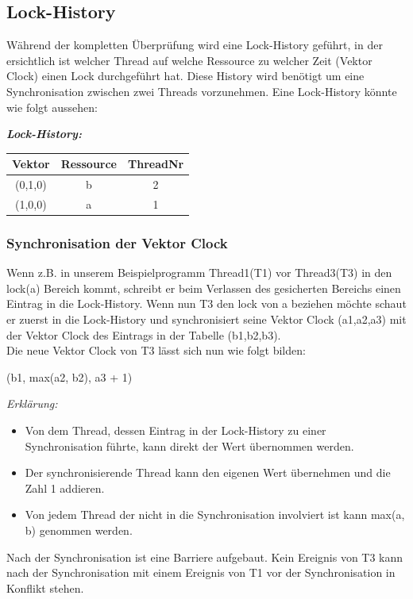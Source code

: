 \documentclass[10pt,a4paper]{article}
\begin{document}
\subsection{Lock-History}
\begin{flushleft}
Während der kompletten Überprüfung wird eine Lock-History geführt, in der ersichtlich ist welcher Thread auf welche Ressource zu welcher Zeit (Vektor Clock) einen Lock durchgeführt hat. Diese History wird benötigt um eine Synchronisation zwischen zwei Threads vorzunehmen. Eine Lock-History könnte wie folgt aussehen:
\end{flushleft}
\begin{center}
\textbf{\textit{Lock-History:}}\\[0.5cm]
\begin{tabular}{ c c c }
  Vektor & Ressource & ThreadNr \\\hline
  (0,1,0) & b & 2 \\
  (1,0,0) & a & 1 \\\hline
\end{tabular}
\end{center}
\subsubsection{Synchronisation der Vektor Clock}
\begin{flushleft}
Wenn z.B. in unserem Beispielprogramm Thread1(T1) vor Thread3(T3) in den lock(a) Bereich kommt, schreibt er beim Verlassen des gesicherten Bereichs einen Eintrag in die Lock-History. Wenn nun T3 den lock von a beziehen möchte schaut er zuerst in die Lock-History und synchronisiert seine Vektor Clock (a1,a2,a3) mit der Vektor Clock des Eintrags in der Tabelle (b1,b2,b3).\\
Die neue Vektor Clock von T3 lässt sich nun wie folgt bilden: 
\begin{center}(b1, max(a2, b2), a3 + 1)\end{center}
\textit{Erklärung:}
\begin{itemize}
\item Von dem Thread, dessen Eintrag in der Lock-History zu einer Synchronisation führte, kann direkt der Wert übernommen werden.
\item Der synchronisierende Thread kann den eigenen Wert übernehmen und die Zahl 1 addieren.
\item Von jedem Thread der nicht in die Synchronisation involviert ist kann max(a, b) genommen werden.
\end{itemize}
Nach der Synchronisation ist eine Barriere aufgebaut. Kein Ereignis von T3 kann nach der Synchronisation mit einem Ereignis von T1 vor der Synchronisation in Konflikt stehen.
\end{flushleft}
\end{document}

